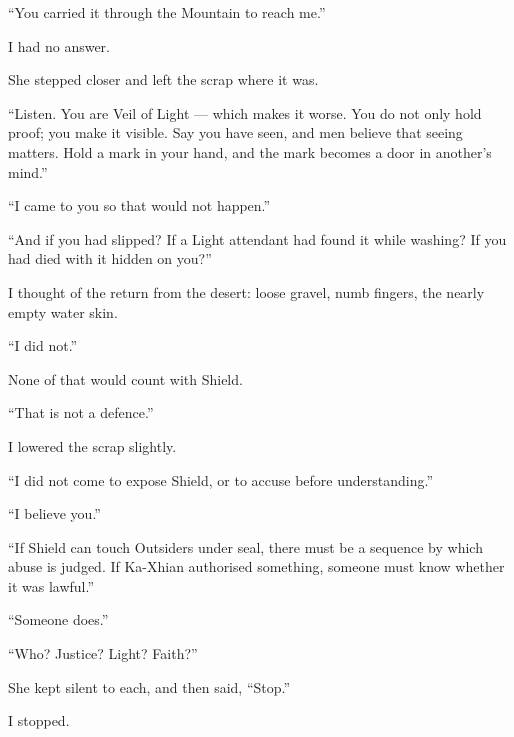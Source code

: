 ``You carried it through the Mountain to reach me.''\par

I had no answer.\par

She stepped closer and left the scrap where it was.\par

``Listen. You are Veil of Light --- which makes it worse. You do not only hold proof; you make it visible. Say you have seen, and men believe that seeing matters. Hold a mark in your hand, and the mark becomes a door in another's mind.''\par

``I came to you so that would not happen.''\par

``And if you had slipped? If a Light attendant had found it while washing? If you had died with it hidden on you?''\par

I thought of the return from the desert: loose gravel, numb fingers, the nearly empty water skin.\par

``I did not.''\par

None of that would count with Shield.\par

``That is not a defence.''\par

I lowered the scrap slightly.\par

``I did not come to expose Shield, or to accuse before understanding.''\par

``I believe you.''\par

``If Shield can touch Outsiders under seal, there must be a sequence by which abuse is judged. If Ka-Xhian authorised something, someone must know whether it was lawful.''\par

``Someone does.''\par

``Who? Justice? Light? Faith?''\par

She kept silent to each, and then said, ``Stop.''\par

I stopped.\par

